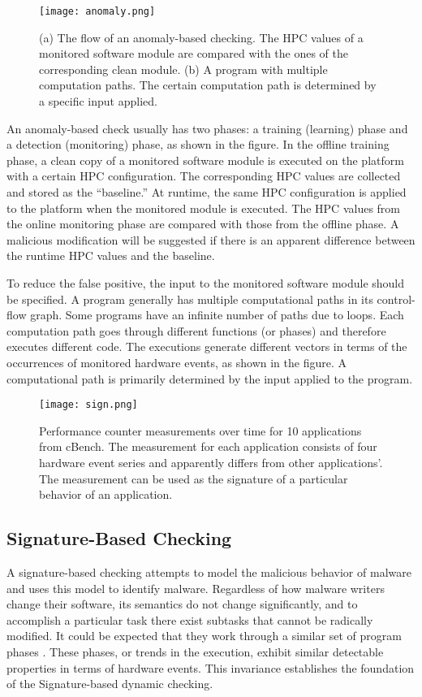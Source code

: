 \documentclass[12pt]{report}
\begin{document}
\begin{figure}[h]
\centering
\texttt{[image: anomaly.png]}
\caption{(a) The flow of an anomaly-based checking. The HPC values of a monitored software module are
compared with the ones of the corresponding clean module. (b) A program with multiple computation paths.
The certain computation path is determined by a specific input applied.}
\end{figure}

An anomaly-based check usually has two phases: a
training (learning) phase and a detection (monitoring) phase, as shown in the figure.
In the offline training phase, a clean copy of a monitored software module is executed
on the platform with a certain HPC configuration. The corresponding HPC values
are collected and stored as the “baseline.” At runtime, the same HPC configuration
is applied to the platform when the monitored module is executed. The HPC values
from the online monitoring phase are compared with those from the offline phase. A
malicious modification will be suggested if there is an apparent difference between the
runtime HPC values and the baseline.


To reduce the false positive, the input to the monitored software module should be
specified. A program generally has multiple computational paths in its control-flow
graph. Some programs have an infinite number of paths due to loops. Each computation path goes through different functions (or phases) and therefore executes different code. The executions generate different vectors in terms of the
occurrences of monitored hardware events, as shown in the figure. A computational
path is primarily determined by the input applied to the program.


\begin{figure}[h]
\centering
\texttt{[image: sign.png]}
\caption{Performance counter measurements over time for 10 applications from cBench. The measurement
for each application consists of four hardware event series and apparently differs from other applications’.
The measurement can be used as the signature of a particular behavior of an application.}
\end{figure}

\subsection{Signature-Based Checking}


 A signature-based checking attempts to model the malicious behavior of malware and uses this model to identify malware. Regardless of how malware writers change their software, its semantics do not change significantly, and to
accomplish a particular task there exist subtasks that cannot be radically modified. It
could be expected that they work through a similar set of program phases . These phases, or trends in the execution, exhibit similar detectable properties in terms of hardware events. This invariance establishes the foundation of the
Signature-based dynamic checking.
\end{document}
